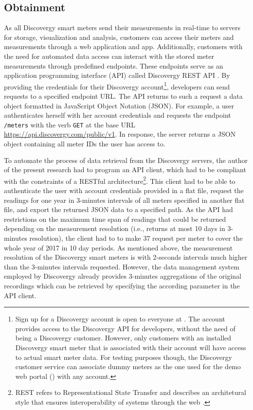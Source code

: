 
\subsection{Obtainment}\label{Sec:Data;Subsec:Obtainment}

As all Discovergy smart meters send their measurements in real-time to servers for storage, visualization and analysis, customers can access their meters and measurements through a web application and app. Additionally, customers with the need for automated data access can interact with the stored meter measurements through predefined endpoints. These endpoints serve as an application programming interface (API) called Discovergy REST API \citep{DiscovergyAPI:2018}. By providing the credentials for their Discovergy account\footnote{Sign up for a Discovergy account is open to everyone at . The account provides access to the Discovergy API for developers, without the need of being a Discovergy customer. However, only customers with an installed Discovergy smart meter that is associated with their account will have access to actual smart meter data. For testing purposes though, the Discovergy customer service can associate dummy meters as the one used for the demo web portal () with any account.}, developers can send requests to a specified endpoint URL. The API returns to such a request a data object formatted in JavaScript Object Notation (JSON). For example, a user authenticates herself with her account credentials and requests the endpoint \texttt{/meters} with the verb \texttt{GET} at the base URL \url{https://api.discovergy.com/public/v1}. In response, the server returns a JSON object containing all meter IDs the user has access to.

To automate the process of data retrieval from the Discovergy servers, the author of the present research had to program an API client, which had to be compliant with the constraints of a RESTful architecture\footnote{REST refers to Representational State Transfer and describes an architetural style that ensures interoperability of systems through the web \citep[][Ch. 5]{fielding:2000}.}. This client had to be able to authenticate the user with account credentials provided in a flat file, request the readings for one year in 3-minutes intervals of all meters specified in another flat file, and export the returned JSON data to a specified path. As the API had restrictions on the maximum time span of readings that could be returned depending on the measurement resolution (i.e., returns at most 10 days in 3-minutes resolution), the client had to to make 37 request per meter to cover the whole year of 2017 in 10 day periods. As mentioned above, the measurement resolution of the Discovergy smart meters is with 2-seconds intervals much higher than the 3-minutes intervals requested. However, the data management system employed by Discovergy already provides 3-minutes aggregations of the original recordings which can be retrieved by specifying the according parameter in the API client.

